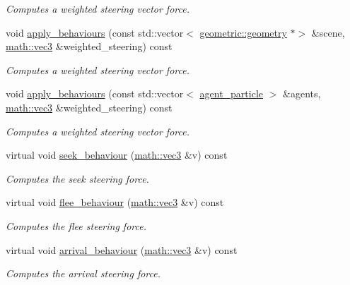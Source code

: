 \begin{DoxyCompactItemize}
\begin{DoxyCompactList}\small\item\em Computes a weighted steering vector force. \end{DoxyCompactList}\item 
void \hyperlink{classphysim_1_1particles_1_1agent__particle_abd9976b5fd7b03ef4301878085e21fbc}{apply\+\_\+behaviours} (const std\+::vector$<$ \hyperlink{classphysim_1_1geometric_1_1geometry}{geometric\+::geometry} $\ast$$>$ \&scene, \hyperlink{structphysim_1_1math_1_1vec3}{math\+::vec3} \&weighted\+\_\+steering) const
\begin{DoxyCompactList}\small\item\em Computes a weighted steering vector force. \end{DoxyCompactList}\item 
void \hyperlink{classphysim_1_1particles_1_1agent__particle_a50b6152ce041bf69df383cc6a6e4e6a7}{apply\+\_\+behaviours} (const std\+::vector$<$ \hyperlink{classphysim_1_1particles_1_1agent__particle}{agent\+\_\+particle} $>$ \&agents, \hyperlink{structphysim_1_1math_1_1vec3}{math\+::vec3} \&weighted\+\_\+steering) const
\begin{DoxyCompactList}\small\item\em Computes a weighted steering vector force. \end{DoxyCompactList}\item 
virtual void \hyperlink{classphysim_1_1particles_1_1agent__particle_ac4eabcfb94d1c5769415f8822556be8b}{seek\+\_\+behaviour} (\hyperlink{structphysim_1_1math_1_1vec3}{math\+::vec3} \&v) const
\begin{DoxyCompactList}\small\item\em Computes the seek steering force. \end{DoxyCompactList}\item 
virtual void \hyperlink{classphysim_1_1particles_1_1agent__particle_aca72133a2c84d5849185cbe8daf8910f}{flee\+\_\+behaviour} (\hyperlink{structphysim_1_1math_1_1vec3}{math\+::vec3} \&v) const
\begin{DoxyCompactList}\small\item\em Computes the flee steering force. \end{DoxyCompactList}\item 
virtual void \hyperlink{classphysim_1_1particles_1_1agent__particle_a2859f442bcd33d39767e15d882ba5229}{arrival\+\_\+behaviour} (\hyperlink{structphysim_1_1math_1_1vec3}{math\+::vec3} \&v) const
\begin{DoxyCompactList}\small\item\em Computes the arrival steering force. \end{DoxyCompactList}\item 
$$
\end{DoxyCompactItemize}

